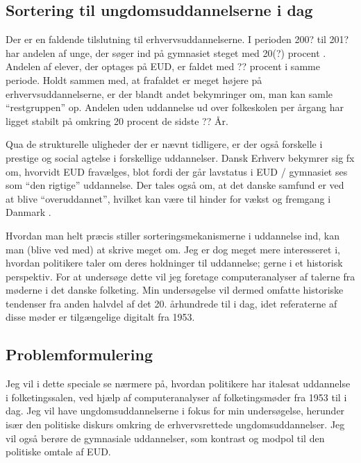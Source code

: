 {\subsection{Sortering til ungdomsuddannelserne i dag}
\label{sec:sorting}
Der er en faldende tilslutning til erhvervsuddannelserne.
I perioden 200? til 201? har andelen af unge, der søger ind på gymnasiet steget med 20(?) procent .
Andelen af elever, der optages på EUD, er faldet med ?? procent i samme periode.
Holdt sammen med, at frafaldet er meget højere på erhvervsuddannelserne, er der blandt andet bekymringer om, man kan samle “restgruppen” op. Andelen uden uddannelse ud over folkeskolen per årgang har ligget stabilt på omkring 20 procent de sidste ?? År.

Qua de strukturelle uligheder der er nævnt tidligere, er der også forskelle i prestige og social agtelse i forskellige uddannelser.
Dansk Erhverv bekymrer sig fx om, hvorvidt EUD fravælges, blot fordi der går lavstatus i EUD / gymnasiet ses som “den rigtige” uddannelse.
Der tales også om, at det danske samfund er ved at blive “overuddannet”, hvilket kan være til hinder for vækst og fremgang i Danmark \autocite{simonsenLadOsGore2016}.

Hvordan man helt præcis stiller sorteringsmekanismerne i uddannelse ind, kan man (blive ved med) at skrive meget om.
Jeg er dog meget mere interesseret i, hvordan politikere taler om deres holdninger til uddannelse; gerne i et historisk perspektiv.
For at undersøge dette vil jeg foretage computeranalyser af talerne fra møderne i det danske folketing.
Min undersøgelse vil dermed omfatte historiske tendenser fra anden halvdel af det 20. århundrede til i dag, idet referaterne af disse møder er tilgængelige digitalt fra 1953.

\subsection{Problemformulering}
\label{sec:pf}
Jeg vil i dette speciale se nærmere på, hvordan politikere har italesat uddannelse i folketingssalen, ved hjælp af computeranalyser af folketingsmøder fra 1953 til i dag.
Jeg vil have ungdomsuddannelserne i fokus for min undersøgelse, herunder især den politiske diskurs omkring de erhvervsrettede ungdomsuddannelser.
Jeg vil også berøre de gymnasiale uddannelser, som kontrast og modpol til den politiske omtale af EUD.

}
